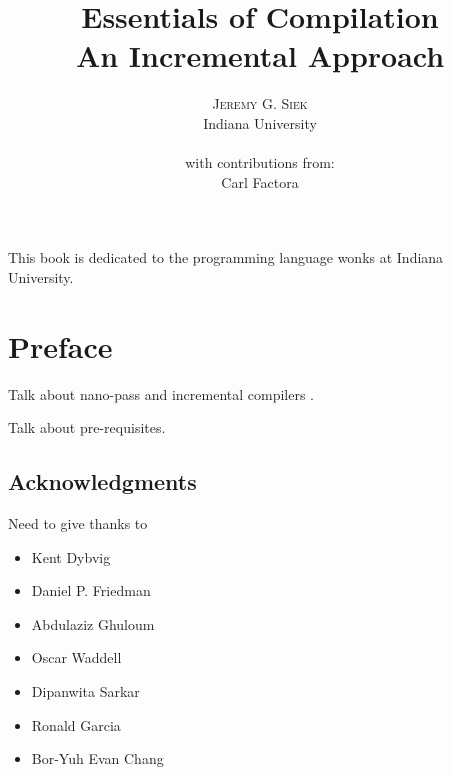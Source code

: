 \documentclass[12pt]{book}
\title{\Huge \textbf{Essentials of Compilation} \\ 
  \huge An Incremental Approach}
\author{\textsc{Jeremy G. Siek} \\
  Indiana University \\
  \\
  with contributions from: \\
  Carl Factora
   }
\newenvironment{dedication}
{
   \cleardoublepage
   \thispagestyle{empty}
   \vspace*{\stretch{1}}
   \hfill\begin{minipage}[t]{0.66\textwidth}
   \raggedright
}
{
   \end{minipage}
   \vspace*{\stretch{3}}
   \clearpage
}
\begin{document}
\frontmatter
\maketitle

\begin{dedication}
This book is dedicated to the programming language wonks at Indiana
University.
\end{dedication}

\tableofcontents

\mainmatter

\chapter*{Preface}

Talk about nano-pass \citep{Sarkar:2004fk,Keep:2012aa} and incremental
compilers \citep{Ghuloum:2006bh}.

Talk about pre-requisites.



\section*{Acknowledgments}

Need to give thanks to 
\begin{itemize}
\item Kent Dybvig
\item Daniel P. Friedman
\item Abdulaziz Ghuloum
\item Oscar Waddell
\item Dipanwita Sarkar
\item Ronald Garcia
\item Bor-Yuh Evan Chang
\end{itemize}
\end{document}
